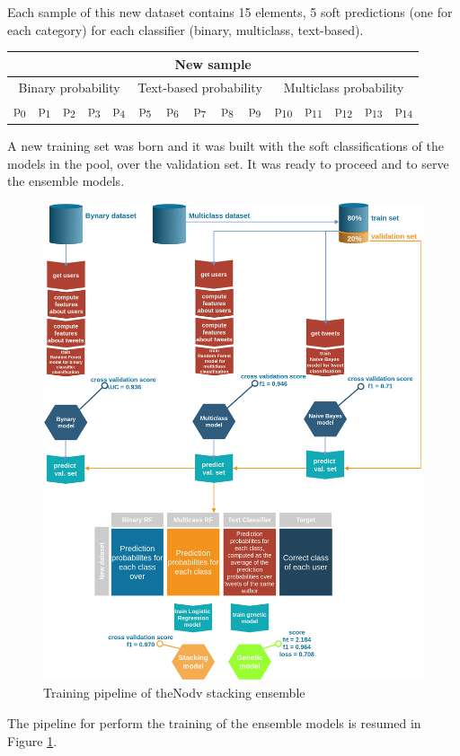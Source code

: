 Each sample of this new dataset contains 15 elements, 5 soft predictions (one for each category) for each classifier (binary, multiclass, text-based).
\begin{center}
	\begin{tabular}{@{}c|c|c|c|c|c|c|c|c|c|c|c|c|c|c@{}}
		\multicolumn{15}{c}{New sample} \\
		\hline
		\multicolumn{5}{c|}{Binary probability} & 
		\multicolumn{5}{c|}{Text-based probability} & 
		\multicolumn{5}{c}{Multiclass probability}\\
		\hline
		p\textsubscript{0} &
		p\textsubscript{1} &
		p\textsubscript{2} &
		p\textsubscript{3} &
		p\textsubscript{4} &
		p\textsubscript{5} &
		p\textsubscript{6} &
		p\textsubscript{7} &
		p\textsubscript{8} &
		p\textsubscript{9} &
		p\textsubscript{10} &
		p\textsubscript{11} &
		p\textsubscript{12} &
		p\textsubscript{13} &
		p\textsubscript{14}\\
		\hline
	\end{tabular}
\end{center}
A new training set was born and it was built with the soft classifications of the models in the pool, over the validation set. It was ready to proceed and to serve the ensemble models.\\

\begin{figure}[htp!]
	\centering
	\includegraphics[width=\columnwidth]{chapter5/figure/stacking.png}
	\caption{Training pipeline of theNodv stacking ensemble}
	\label{fig:stacking_pipeline}
\end{figure}
The pipeline for perform the training of the ensemble models is resumed in Figure \ref{fig:stacking_pipeline}.

